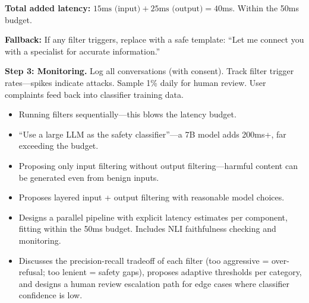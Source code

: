\begin{interviewq}
\textbf{Total added latency:} $15\text{ms (input)} + 25\text{ms (output)} = 40$ms. Within the 50ms budget.

\textbf{Fallback:} If any filter triggers, replace with a safe template: ``Let me connect you with a specialist for accurate information.''

\textbf{Step 3: Monitoring.} Log all conversations (with consent). Track filter trigger rates---spikes indicate attacks. Sample 1\% daily for human review. User complaints feed back into classifier training data.

\redflags
\begin{itemize}
    \item Running filters sequentially---this blows the latency budget.
    \item ``Use a large LLM as the safety classifier''---a 7B model adds 200ms+, far exceeding the budget.
    \item Proposing only input filtering without output filtering---harmful content can be generated even from benign inputs.
\end{itemize}


\goodgreat
\begin{itemize}
    \item {} Proposes layered input + output filtering with reasonable model choices.
    \item {} Designs a parallel pipeline with explicit latency estimates per component, fitting within the 50ms budget. Includes NLI faithfulness checking and monitoring.
    \item {} Discusses the precision-recall tradeoff of each filter (too aggressive = over-refusal; too lenient = safety gaps), proposes adaptive thresholds per category, and designs a human review escalation path for edge cases where classifier confidence is low.
\end{itemize}

\end{interviewq}


